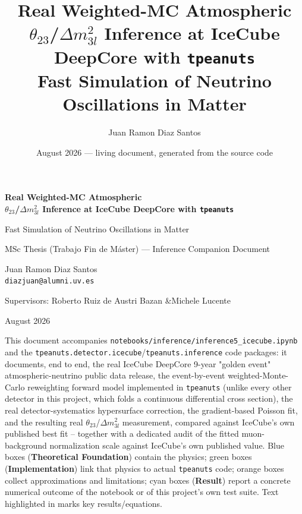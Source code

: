 \documentclass[11pt,a4paper,openany]{report}
\title{\Huge Real Weighted-MC Atmospheric $\theta_{23}$/$\Delta m^2_{3l}$ Inference at IceCube DeepCore with \texttt{tpeanuts}\\[4pt]
  \Large Fast Simulation of Neutrino Oscillations in Matter}
\author{Juan Ramon Diaz Santos}
\date{August 2026 --- living document, generated from the source code}
\begin{document}
\begin{titlepage}
  \centering
  \vspace*{1.6cm}
  {\Huge\bfseries\color{icecubeColor} Real Weighted-MC Atmospheric\\[4pt] $\theta_{23}$/$\Delta m^2_{3l}$ Inference at IceCube DeepCore with \texttt{tpeanuts}\par}
  \vspace{0.8cm}
  {\Large Fast Simulation of Neutrino Oscillations in Matter\par}
  \vspace{1.5cm}
  {\large MSc Thesis (Trabajo Fin de M\'aster) --- Inference Companion Document\par}
  \vspace{0.3cm}
  {\large Juan Ramon Diaz Santos \\ \texttt{diazjuan@alumni.uv.es}\par}
  \vspace{0.6cm}
  {\normalsize Supervisors: Roberto Ruiz de Austri Bazan \quad\&\quad Michele Lucente\par}
  \vfill
  {\normalsize August 2026\par}
  \vspace{0.5cm}
  \begin{tcolorbox}[colback=icecubeColor!5,colframe=icecubeColor,width=0.85\textwidth,sharp corners=all,rounded corners=all,arc=1mm]
    \small
    This document accompanies \texttt{notebooks/inference/inference5\_icecube.ipynb} and the
    \texttt{tpeanuts.detector.icecube}/\texttt{tpeanuts.inference} code packages: it documents,
    end to end, the real IceCube DeepCore 9-year "golden event" atmospheric-neutrino public data
    release, the event-by-event weighted-Monte-Carlo reweighting forward model implemented in
    \texttt{tpeanuts} (unlike every other detector in this project, which folds a continuous
    differential cross section), the real detector-systematics hypersurface correction, the
    gradient-based Poisson fit, and the resulting real $\theta_{23}$/$\Delta m^2_{3l}$
    measurement, compared against IceCube's own published best fit -- together with a dedicated
    audit of the fitted muon-background normalization scale against IceCube's own published
    value. Blue boxes (\textbf{Theoretical Foundation}) contain the physics; green boxes
    (\textbf{Implementation}) link that physics to actual \texttt{tpeanuts} code; orange boxes
    collect approximations and limitations; cyan boxes (\textbf{Result}) report a concrete
    numerical outcome of the notebook or of this project's own test suite. Text highlighted in
     marks key results/equations.
  \end{tcolorbox}
\end{titlepage}
\end{document}
